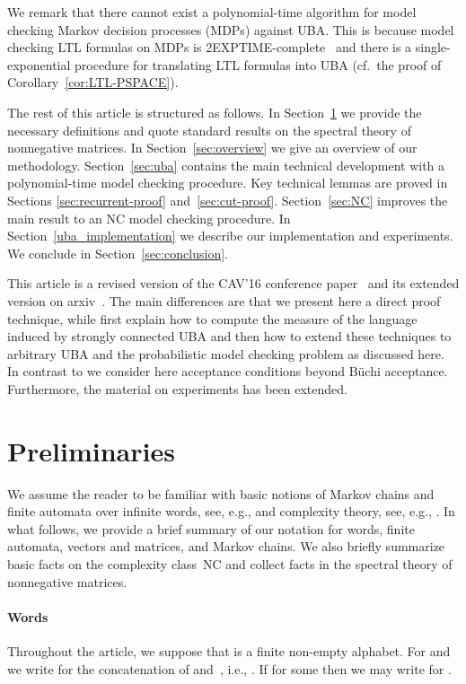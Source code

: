 \documentclass{elsarticle}
\begin{document}
We remark that there cannot exist a polynomial-time algorithm for model checking Markov decision processes (MDPs) against UBA.
This is because model checking LTL formulas on MDPs is 2EXPTIME-complete~\cite{CY95} and there is a single-exponential procedure for translating LTL formulas into UBA (cf.\ the proof of Corollary~\ref{cor:LTL-PSPACE}).

The rest of this article is structured as follows.
In Section~\ref{sec:prelim} we provide the necessary definitions and quote standard results on the spectral theory of nonnegative matrices.
In Section~\ref{sec:overview} we give an overview of our methodology.
Section~\ref{sec:uba} contains the main technical development with a polynomial-time model checking procedure.
Key technical lemmas are proved in Sections \ref{sec:recurrent-proof} and~\ref{sec:cut-proof}.
Section~\ref{sec:NC} improves the main result to an NC model checking procedure.
In Section~\ref{uba_implementation} we describe our implementation and experiments.
We conclude in Section~\ref{sec:conclusion}.

This article is a revised version of the CAV'16 conference
paper~\cite{BKKKMW16} and its extended version on
arxiv~\cite{cav16full}.  The main differences are that we present here
a direct proof technique, while \cite{BKKKMW16,cav16full} first
explain how to compute the measure of the language induced by strongly
connected UBA and then how to extend these techniques to arbitrary UBA
and the probabilistic model checking problem as discussed here.  In
contrast to \cite{BKKKMW16,cav16full} we consider here acceptance
conditions beyond B\"uchi acceptance.  Furthermore, the material on
experiments has been extended.

\section{Preliminaries}
\label{sec:prelim}

We assume the reader to be familiar with basic notions of Markov
chains and finite automata over infinite words, see, e.g., \cite{GraedelThomasWilke02,Kulkarni} and complexity theory, see, e.g., \cite{Pap94}.  In what follows, we
provide a brief summary of our notation for words, finite automata,
vectors and matrices, and Markov chains.
We also briefly summarize basic facts on the complexity class~NC and collect facts in the spectral theory of nonnegative matrices.

\paragraph*{Words}
Throughout the article, we suppose that  is a finite non-empty alphabet.
For  and  we write  for the concatenation of  and~, i.e., .
If  for some  then we may write  for .
\end{document}
